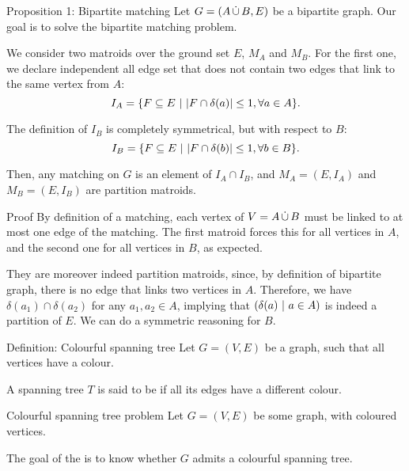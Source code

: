 \documentclass[a4paper]{article}
\begin{document}
\begin{parag}{Proposition 1: Bipartite matching}
    Let $G = \left(A \dcup B, E\right)$ be a bipartite graph. Our goal is to solve the bipartite matching problem.

    We consider two matroids over the ground set $E$, $M_A$ and $M_B$. For the first one, we declare independent all edge set that does not contain two edges that link to the same vertex from $A$:
    \[I_A = \left\{F \subseteq E \suchthat \left|F \cap \delta\left(a\right)\right| \leq 1, \forall a \in A\right\}.\]

    The definition of $I_B$ is completely symmetrical, but with respect to $B$: 
    \[I_B = \left\{F\subseteq E \suchthat \left|F \cap \delta\left(b\right)\right| \leq 1, \forall b \in B\right\}.\]

    Then, any matching on $G$ is an element of $I_A \cap I_B$, and $M_A = \left(E, I_A\right)$ and $M_B = \left(E, I_B\right)$ are partition matroids.

    \begin{subparag}{Proof}
        By definition of a matching, each vertex of $V = A \operatorname*{\dot{\cup}} B$ must be linked to at most one edge of the matching. The first matroid forces this for all vertices in $A$, and the second one for all vertices in $B$, as expected.

        They are moreover indeed partition matroids, since, by definition of bipartite graph, there is no edge that links two vertices in $A$. Therefore, we have $\delta\left(a_1\right) \cap \delta\left(a_2\right)$ for any $a_1, a_2 \in A$, implying that $\left(\delta\left(a\right) \suchthat a \in A\right)$ is indeed a partition of $E$. We can do a symmetric reasoning for $B$.
    \end{subparag}
\end{parag}

\begin{parag}{Definition: Colourful spanning tree}
    Let $G = \left(V, E\right)$ be a graph, such that all vertices have a colour.

    A spanning tree $T$ is said to be  if all its edges have a different colour.
\end{parag}

\begin{parag}{Colourful spanning tree problem}
    Let $G = \left(V, E\right)$ be some graph, with coloured vertices.

    The goal of the  is to know whether $G$ admits a colourful spanning tree.
\end{parag}
\end{document}
